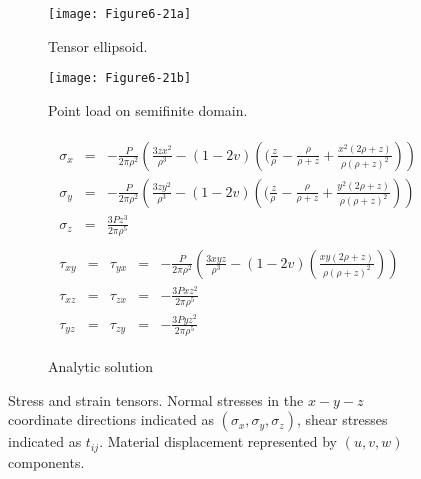 \begin{figure}[htb]
	\begin{subfigure}[h]{0.48\linewidth}
		\texttt{[image: Figure6-21a]}
		\caption{Tensor ellipsoid.}
		\label{fig:Figure6-21a}
	\end{subfigure}
	\hfill
	\begin{subfigure}[h]{0.48\linewidth}
		\texttt{[image: Figure6-21b]}
		\caption{Point load on semifinite domain.}
		\label{fig:Figure6-21b}
	\end{subfigure}
	\hfill
	\begin{subfigure}[h]{0.96\linewidth}
		\LARGE
		\begin{equation*}
		\begin{array}{l}
				\begin{array}{lll}
				\sigma{_x} & = &  -\frac{P}{2 \pi \rho ^2}\left(\frac{3zx^2}{\rho ^3} -(1-2v)\left((\frac{z}{\rho\
				} - \frac{\rho}{\rho+z}+\frac{x ^2 (2 \rho + z)}{\rho ( \rho + z) ^2} \right) \right)\\
				\sigma{_y}  & = & -\frac{P}{2 \pi \rho ^2}\left(\frac{3zy^2}{\rho ^3} -(1-2v)\left((\frac{z}{\rho\
				} - \frac{\rho}{\rho+z}+\frac{y ^2 (2 \rho + z)}{\rho ( \rho + z) ^2} \right) \right)  \\
			    \sigma{_z}  & = & \frac{3Pz^3}{2\pi\rho^5}
				\end{array} \\
				\begin{array}{lllll}
				\tau_{xy} &=& \tau_{yx} &=& -\frac{P}{2 \pi \rho ^2}\left( \frac{3xyz}{\rho ^3} - (1-2v)\left(\frac{xy(2 \rho + z)}{\rho ( \rho + z) ^2}\right)\right) \\
				\tau_{xz}&=&\tau_{zx} &=& -\frac{3Pxz^2}{2 \pi \rho ^5}\\
				\tau_{yz}&=&\tau_{zy} &=& -\frac{3Pyz^2}{2 \pi \rho ^5}
				\end{array}
		\end{array}
	\end{equation*}
		\caption{Analytic solution}\label{fig:Figure6-21c}
	\end{subfigure}
	\caption{Stress and strain tensors. Normal stresses in the $x-y-z$ coordinate directions indicated as $(\sigma_x, \sigma_y, \sigma_z)$, shear stresses indicated as $t_{ij}$. Material displacement represented by $(u, v, w)$ components.}\label{fig:Figure6-21}
\end{figure}

